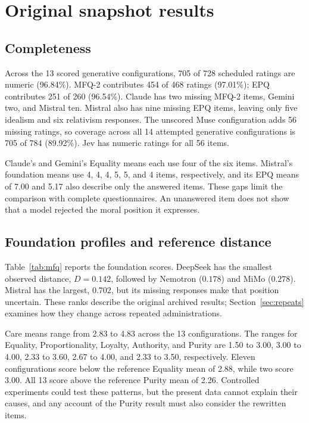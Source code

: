 \documentclass[11pt]{article}
\begin{document}
\section{Original snapshot results}
\subsection{Completeness}
Across the 13 scored generative configurations, 705 of 728 scheduled ratings are numeric (96.84\%). MFQ-2 contributes 454 of 468 ratings (97.01\%); EPQ contributes 251 of 260 (96.54\%). Claude has two missing MFQ-2 items, Gemini two, and Mistral ten. Mistral also has nine missing EPQ items, leaving only five idealism and six relativism responses. The unscored Muse configuration adds 56 missing ratings, so coverage across all 14 attempted generative configurations is 705 of 784 (89.92\%). Jev has numeric ratings for all 56 items.

Claude's and Gemini's Equality means each use four of the six items. Mistral's foundation means use 4, 4, 4, 5, 5, and 4 items, respectively, and its EPQ means of 7.00 and 5.17 also describe only the answered items. These gaps limit the comparison with complete questionnaires. An unanswered item does not show that a model rejected the moral position it expresses.

\subsection{Foundation profiles and reference distance}
Table~\ref{tab:mfq} reports the foundation scores. DeepSeek has the smallest observed distance, $D=0.142$, followed by Nemotron ($0.178$) and MiMo ($0.278$). Mistral has the largest, $0.702$, but its missing responses make that position uncertain. These ranks describe the original archived results; Section~\ref{sec:repeats} examines how they change across repeated administrations.

Care means range from 2.83 to 4.83 across the 13 configurations. The ranges for Equality, Proportionality, Loyalty, Authority, and Purity are 1.50 to 3.00, 3.00 to 4.00, 2.33 to 3.60, 2.67 to 4.00, and 2.33 to 3.50, respectively. Eleven configurations score below the reference Equality mean of 2.88, while two score 3.00. All 13 score above the reference Purity mean of 2.26. Controlled experiments could test these patterns, but the present data cannot explain their causes, and any account of the Purity result must also consider the rewritten items.
\end{document}
